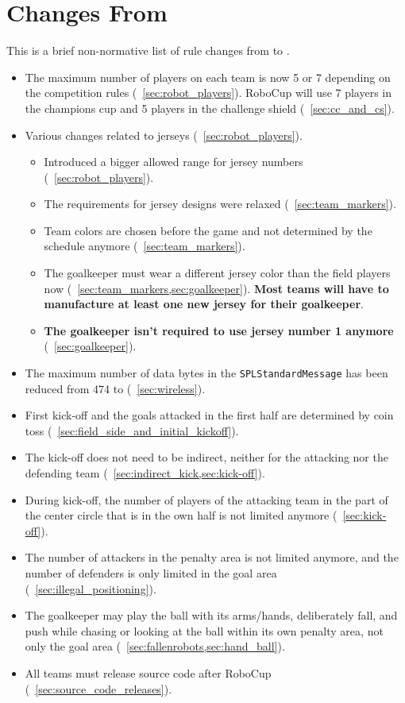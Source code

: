 \section{Changes From \LastRCYear}
This is a brief non-normative list of rule changes from \LastRCYear to \RCYear.

\begin{itemize}
  \item The maximum number of players on each team is now 5 or 7 depending on the competition rules (\cf~\cref{sec:robot_players}). RoboCup \RCYear will use 7 players in the champions cup and 5 players in the challenge shield (\cf~\cref{sec:cc_and_cs}).
  \item Various changes related to jerseys (\cf~\cref{sec:robot_players}).
  \begin{itemize}
    \item Introduced a bigger allowed range for jersey numbers (\cf~\cref{sec:robot_players}).
    \item The requirements for jersey designs were relaxed (\cf~\cref{sec:team_markers}).
    \item Team colors are chosen before the game and not determined by the schedule anymore (\cf~\cref{sec:team_markers}).
    \item The goalkeeper must wear a different jersey color than the field players now (\cf~\cref{sec:team_markers,sec:goalkeeper}). \textbf{Most teams will have to manufacture at least one new jersey for their goalkeeper}.
    \item \textbf{The goalkeeper isn't required to use jersey number 1 anymore} (\cf~\cref{sec:goalkeeper}).
  \end{itemize}
  \item The maximum number of data bytes in the \texttt{SPLStandardMessage} has been reduced from 474 to \TeamMessageDataSize{} (\cf~\cref{sec:wireless}).
  \item First kick-off and the goals attacked in the first half are determined by coin toss (\cf~\cref{sec:field_side_and_initial_kickoff}).
  \item The kick-off does not need to be indirect, neither for the attacking nor the defending team (\cf~\cref{sec:indirect_kick,sec:kick-off}).
  \item During kick-off, the number of players of the attacking team in the part of the center circle that is in the own half is not limited anymore (\cf~\cref{sec:kick-off}).
  \item The number of attackers in the penalty area is not limited anymore, and the number of defenders is only limited in the goal area (\cf~\cref{sec:illegal_positioning}).
  \item The goalkeeper may play the ball with its arms/hands, deliberately fall, and push while chasing or looking at the ball within its own penalty area, not only the goal area (\cf~\cref{sec:fallenrobots,sec:hand_ball}).
  \item All teams must release source code after RoboCup (\cf~\cref{sec:source_code_releases}).
\end{itemize}
